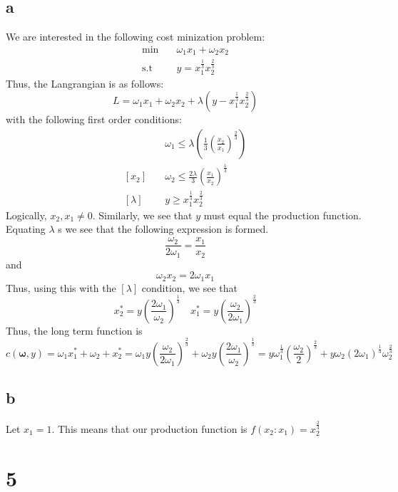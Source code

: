 \documentclass[11pt]{article}
\newcommand{\st}{\text{s.t}}
\begin{document}
\subsection*{a}
We are interested in the following cost minization problem:
\begin{align*}
    \min & \quad \omega_1 x_1 + \omega_2 x_2\\
    \st & \quad y = x_1^{\frac{1}{3}} x_2^{\frac{2}{3}}
\end{align*}
Thus, the Langrangian is as follows:
\[
L = \omega_1x_1 + \omega_2x_2 +\lambda(y -  x_1^{\frac{1}{3}} x_2^{\frac{2}{3}})
\]
with the following first order conditions:
\begin{align*}
    [x_1] & \quad \omega_1 \leq \lambda \left( \frac{1}{3} \left( \frac{x_2}{x_1} \right)^\frac{2}{3} \right)\\
    [x_2] & \quad \omega_2 \leq \frac{2\lambda}{3} \left( \frac{x_1}{x_2} \right)^\frac{1}{3}\\
    [\lambda] & \quad y \geq x_1^\frac{1}{3} x_2^\frac{2}{3}
\end{align*}
Logically, $x_2, x_1 \neq 0$. Similarly, we see that $y$ must equal the production function. Equating $\lambda$ s we see that the following expression is formed. 
\[
\frac{\omega_2}{2 \omega_1} = \frac{x_1}{x_2}
\]
and 
\[
\omega_2 x_2 = 2\omega_1 x_1
\]
Thus, using this with the $[\lambda]$ condition, we see that 
\[
x_2^* = y \left( \frac{2\omega_1}{\omega_2} \right)^\frac{1}{3} \quad x_1^* = y \left( \frac{\omega_2}{2\omega_1} \right)^\frac{2}{3}
\]
Thus, the long term function is
\[
c(\mathbf{\omega}, y) = \omega_1 x_1^* + \omega_2 + x_2^* = \omega_1 y \left( \frac{\omega_2}{2\omega_1} \right)^\frac{2}{3} + \omega_2  y \left( \frac{2\omega_1}{\omega_2} \right)^\frac{1}{3} = y \omega_1^\frac{1}{3} \left( \frac{\omega_2}{2} \right)^\frac{2}{3} + y \omega_2 (2\omega_1)^\frac{1}{3}\omega_2^\frac{2}{3}
\]
\subsection*{b}
Let $x_1 = 1$. This means that our production function is $f(x_2 : x_1) = x_2^\frac{2}{3}$
\section*{5}
\end{document}
